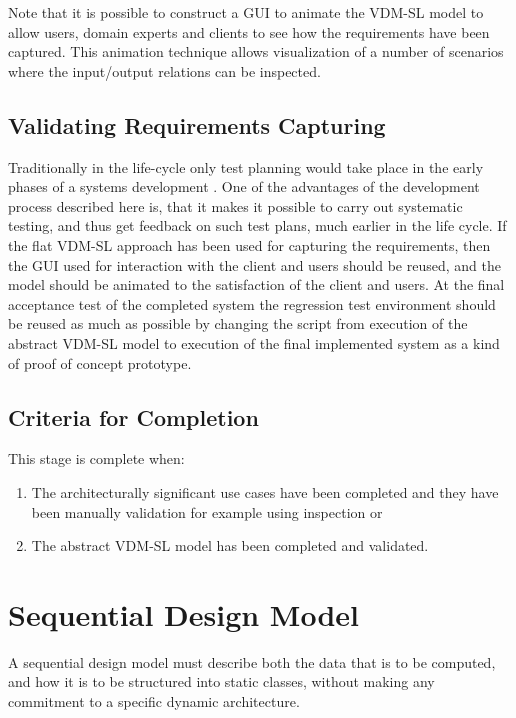\documentclass{overturerepchap}
\begin{document}
Note that it is possible to construct a GUI to animate the VDM-SL
model to allow users, domain experts and clients to see how the
requirements have been captured.  This animation technique allows
visualization of a number of scenarios where the input/output
relations can be inspected.

\subsection{Validating Requirements Capturing}

Traditionally in the life-cycle only test planning would take place in
the early phases of a systems development \cite{Sommerville82}. One of
the advantages of the development process described here is, that it
makes it possible to carry out systematic testing, and thus get
feedback on such test plans, much earlier in the life cycle. If the
flat VDM-SL approach has been used for capturing the requirements,
then the GUI used for interaction with the client and users should be
reused, and the model should be animated to the satisfaction of the
client and users. At the final acceptance test of the completed system
the regression test environment should be reused as much as possible
by changing the script from execution of the abstract VDM-SL model to
execution of the final implemented system as a kind of proof of concept 
prototype.

\subsection{Criteria for Completion}

This stage is complete when:

\begin{enumerate}
\item The architecturally significant use cases have been completed 
      and they have been manually validation for example using inspection or
\item The abstract VDM-SL model has been completed and validated.
\end{enumerate}

\section{Sequential Design Model}

A sequential design model must describe both the data that is to be
computed, and how it is to be structured into static classes, without
making any commitment to a specific dynamic architecture.
\end{document}
